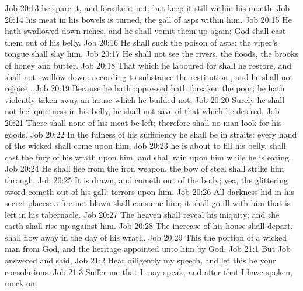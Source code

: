 \vs Job 20:13  he spare it, and forsake it not; but keep it still within his mouth:
\vs Job 20:14  his meat in his bowels is turned,  the gall of asps within him.
\vs Job 20:15 He hath swallowed down riches, and he shall vomit them up again: God shall cast them out of his belly.
\vs Job 20:16 He shall suck the poison of asps: the viper's tongue shall slay him.
\vs Job 20:17 He shall not see the rivers, the floods, the brooks of honey and butter.
\vs Job 20:18 That which he laboured for shall he restore, and shall not swallow  down: according to  substance  the restitution , and he shall not rejoice .
\vs Job 20:19 Because he hath oppressed  hath forsaken the poor;  he hath violently taken away an house which he builded not;
\vs Job 20:20 Surely he shall not feel quietness in his belly, he shall not save of that which he desired.
\vs Job 20:21 There shall none of his meat be left; therefore shall no man look for his goods.
\vs Job 20:22 In the fulness of his sufficiency he shall be in straits: every hand of the wicked shall come upon him.
\vs Job 20:23  he is about to fill his belly,  shall cast the fury of his wrath upon him, and shall rain  upon him while he is eating.
\vs Job 20:24 He shall flee from the iron weapon,  the bow of steel shall strike him through.
\vs Job 20:25 It is drawn, and cometh out of the body; yea, the glittering sword cometh out of his gall: terrors  upon him.
\vs Job 20:26 All darkness  hid in his secret places: a fire not blown shall consume him; it shall go ill with him that is left in his tabernacle.
\vs Job 20:27 The heaven shall reveal his iniquity; and the earth shall rise up against him.
\vs Job 20:28 The increase of his house shall depart,  shall flow away in the day of his wrath.
\vs Job 20:29 This  the portion of a wicked man from God, and the heritage appointed unto him by God.
\vs Job 21:1 But Job answered and said,
\vs Job 21:2 Hear diligently my speech, and let this be your consolations.
\vs Job 21:3 Suffer me that I may speak; and after that I have spoken, mock on.
